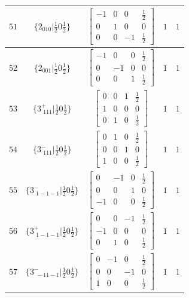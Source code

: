 \documentclass[fleqn,8pt]{jsarticle}
\begin{document}
\begin{longtable}{ccccc}
$ 51 $ & $ \{2{}_{010}|\frac{1}{2} 0 \frac{1}{2}\} $ & $ \begin{bmatrix} -1 & 0 & 0 & \frac{1}{2} \\ 0 & 1 & 0 & 0 \\ 0 & 0 & -1 & \frac{1}{2} \end{bmatrix} $ & $ 1 $ & $ 1 $ \\ \hline
$ 52 $ & $ \{2{}_{001}|\frac{1}{2} 0 \frac{1}{2}\} $ & $ \begin{bmatrix} -1 & 0 & 0 & \frac{1}{2} \\ 0 & -1 & 0 & 0 \\ 0 & 0 & 1 & \frac{1}{2} \end{bmatrix} $ & $ 1 $ & $ 1 $ \\ \hline
$ 53 $ & $ \{3^{+}_{\,\,111}|\frac{1}{2} 0 \frac{1}{2}\} $ & $ \begin{bmatrix} 0 & 0 & 1 & \frac{1}{2} \\ 1 & 0 & 0 & 0 \\ 0 & 1 & 0 & \frac{1}{2} \end{bmatrix} $ & $ 1 $ & $ 1 $ \\ \hline
$ 54 $ & $ \{3^{-}_{\,\,111}|\frac{1}{2} 0 \frac{1}{2}\} $ & $ \begin{bmatrix} 0 & 1 & 0 & \frac{1}{2} \\ 0 & 0 & 1 & 0 \\ 1 & 0 & 0 & \frac{1}{2} \end{bmatrix} $ & $ 1 $ & $ 1 $ \\ \hline
$ 55 $ & $ \{3^{-}_{\,\,1-1-1}|\frac{1}{2} 0 \frac{1}{2}\} $ & $ \begin{bmatrix} 0 & -1 & 0 & \frac{1}{2} \\ 0 & 0 & 1 & 0 \\ -1 & 0 & 0 & \frac{1}{2} \end{bmatrix} $ & $ 1 $ & $ 1 $ \\ \hline
$ 56 $ & $ \{3^{+}_{\,\,1-1-1}|\frac{1}{2} 0 \frac{1}{2}\} $ & $ \begin{bmatrix} 0 & 0 & -1 & \frac{1}{2} \\ -1 & 0 & 0 & 0 \\ 0 & 1 & 0 & \frac{1}{2} \end{bmatrix} $ & $ 1 $ & $ 1 $ \\ \hline
$ 57 $ & $ \{3^{-}_{\,\,-11-1}|\frac{1}{2} 0 \frac{1}{2}\} $ & $ \begin{bmatrix} 0 & -1 & 0 & \frac{1}{2} \\ 0 & 0 & -1 & 0 \\ 1 & 0 & 0 & \frac{1}{2} \end{bmatrix} $ & $ 1 $ & $ 1 $ \\ \hline

\end{longtable}
\end{document}

